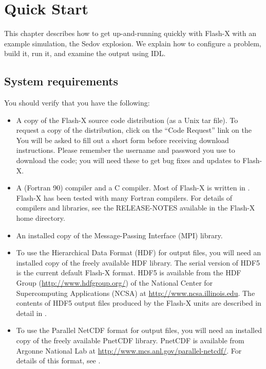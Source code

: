 
\chapter{Quick Start}
\label{Chp:Quickstart}

This chapter describes how to get up-and-running quickly with Flash-X
with an example simulation, the Sedov explosion.  We explain
how to configure a problem, build it, run it, and examine the output
using IDL.

\section{System requirements}

You should verify that you have the following:

\begin{itemize}

\item A copy of the Flash-X source code distribution (as a Unix tar
file). To request a copy of the distribution, click on the ``Code Request''
link on the %
You will be asked to fill out a short form before
receiving download instructions. Please remember the username and
password you use to download the code; you will need these to get
bug fixes and updates to Flash-X.

\item A  (Fortran 90) compiler and a C compiler.  Most of Flash-X is
written in .  Flash-X has been tested
with many Fortran compilers.  For details of compilers and libraries,
see the RELEASE-NOTES available in the Flash-X home directory.

\item An installed copy of the Message-Passing Interface (MPI)
library. 

\item To use the Hierarchical Data Format (HDF) for output files, you
will need an installed copy of the freely available HDF library.
The serial version of HDF5 is the current default Flash-X format. HDF5 is
available from the HDF Group (\url{http://www.hdfgroup.org/}) of the National 
Center for Supercomputing Applications (NCSA) at
\url{http://www.ncsa.illinois.edu}. The contents of HDF5 output files
produced by the Flash-X units are described in detail in
.

\item To use the Parallel NetCDF format for output files, you will need
an installed copy of the freely available PnetCDF library.  PnetCDF is
available from Argonne National Lab at \newline
\url{http://www.mcs.anl.gov/parallel-netcdf/}.  For details of
this format, see .



\end{itemize}
